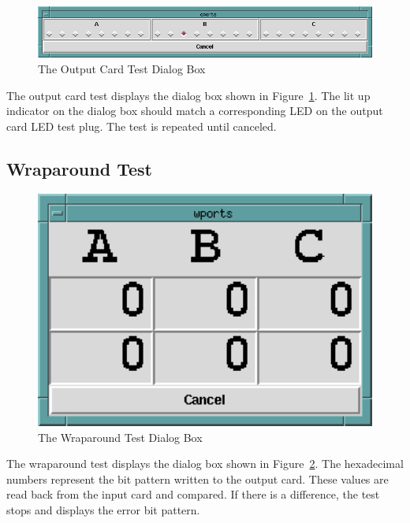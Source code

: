 \begin{figure}[hbpt]
\begin{centering}
\includegraphics[width=5in]{UTOutputTest.png}
\caption{The Output Card Test Dialog Box}
\label{fig:ut:outtest}
\end{centering}
\end{figure}
The output card test displays the dialog box shown in
Figure~\ref{fig:ut:outtest}.  The lit up indicator on the dialog box
should match a corresponding LED on the output card LED test plug. The
test is repeated until canceled.

\subsection{Wraparound Test}

\begin{figure}[hbpt]
\begin{centering}
\includegraphics[width=5in]{UTWrapAround.png}
\caption{The Wraparound Test Dialog Box}
\label{fig:ut:wraptest}
\end{centering}
\end{figure}
The wraparound test displays the dialog box shown in
Figure~\ref{fig:ut:wraptest}.  The hexadecimal numbers represent the bit
pattern written to the output card.  These values are read back from the
input card and compared.  If there is a difference, the test stops and
displays the error bit pattern.

